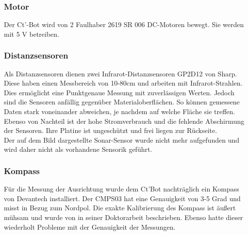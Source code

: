 \documentclass[twoside,12pt,a4paper]{report}
\begin{document}
	\subsubsection{Motor}
	Der Ct'-Bot wird von 2 Faulhaber 2619 SR 006 DC-Motoren bewegt. Sie werden mit 5 V betreiben. 
	
	\subsubsection{Distanzsensoren}
	Als Distanzsensoren dienen zwei Infrarot-Distanzsensoren GP2D12 von Sharp. Diese haben einen Messbereich von 10-80cm und arbeiten mit Infrarot-Strahlen. Dies ermöglicht eine Punktgenaue Messung mit zuverlässigen Werten. Jedoch sind die Sensoren anfällig gegenüber Materialoberflächen. So können gemessene Daten stark voneinander abweichen, je nachdem auf welche Fläche sie treffen. Ebenso von Nachteil ist der hohe Stromverbrauch und die fehlende Abschirmung der Sensoren. Ihre Platine ist ungeschützt und frei liegen zur Rückseite. \\
	Der auf dem Bild dargestellte Sonar-Sensor wurde nicht mehr aufgefunden und wird daher nicht als vorhandene Sensorik geführt. 
	
	\subsubsection{Kompass}
	Für die Messung der Ausrichtung wurde dem Ct'Bot nachträglich ein Kompass von Devantech installiert. Der CMPS03 hat eine Genauigkeit von 3-5 Grad und misst in Bezug zum Nordpol. Die exakte Kalibrierung des Kompass ist äußert mühsam und wurde von \cite{Hofmeister} in seiner Doktorarbeit beschrieben. Ebenso hatte dieser wiederholt Probleme mit der Genauigkeit der Messungen. 
	
\end{document}
